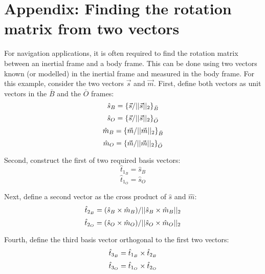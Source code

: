 \documentclass{article}
\begin{document}
\newpage
\section*{Appendix: Finding the rotation matrix from two vectors}
For navigation applications, it is often required to find the rotation matrix between an inertial frame and a body frame. This can be done using two vectors known (or modelled) in the inertial frame and measured in the body frame. For this example, consider the two vectors $\vec{s}$ and $\vec{m}$. First, define both vectors as unit vectors in the $\bar{B}$ and the $\bar{O}$ frames:
\begin{equation}
    \hat{s}_B = {\{\vec{s}/||\vec{s}||_2\}}_{\bar{B}}
\end{equation}
\begin{equation}
    \hat{s}_O = {\{\vec{s}/||\vec{s}||_2\}}_{\bar{O}}
\end{equation}
\begin{equation}
    \hat{m}_B = {\{\vec{m}/||\vec{m}||_2\}}_{\bar{B}}
\end{equation}
\begin{equation}
    \hat{m}_O = {\{\vec{m}/||\vec{m}||_2\}}_{\bar{O}}
\end{equation}

Second, construct the first of two required basis vectors:
\begin{equation}
    \hat{t}_{1_B} = \hat{s}_B
\end{equation}
\begin{equation}
    \hat{t}_{1_O} = \hat{s}_O
\end{equation}

Next, define a second vector as the cross product of $\hat{s}$ and $\hat{m}$:
\begin{equation}
    \hat{t}_{2_B} = (\hat{s}_B\times\hat{m}_B)/||\hat{s}_B\times\hat{m}_B||_2
\end{equation}
\begin{equation}
    \hat{t}_{2_O} = (\hat{s}_O\times\hat{m}_O)/||\hat{s}_O\times\hat{m}_O||_2
\end{equation}

Fourth, define the third basis vector orthogonal to the first two vectors:
\begin{equation}
    \hat{t}_{3_B} = \hat{t}_{1_B}\times\hat{t}_{2_B}
\end{equation}
\begin{equation}
    \hat{t}_{3_O} = \hat{t}_{1_O}\times\hat{t}_{2_O}
\end{equation}
\end{document}
